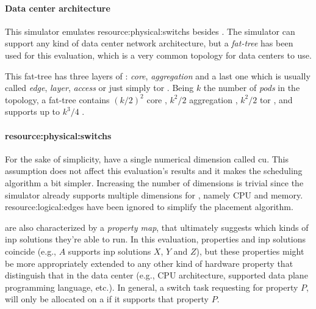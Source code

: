 \paragraph{Data center architecture}
This simulator emulates \glspl{resource:physical:switch} besides .
The simulator can support any kind of data center network architecture, but a \textit{fat-tree} has been used for this evaluation, which is a very common topology for data centers to use.

This fat-tree has three layers of : \textit{core}, \textit{aggregation} and a last one which is usually called \textit{edge}, \textit{layer}, \textit{access} or just simply \gls{tor} .
Being $k$ the number of \textit{pods} in the topology, a fat-tree contains $(k/2)^2$ core , $k^2/2$ aggregation , $k^2/2$ \gls{tor} , and supports up to $k^3/4$ .

\paragraph{\Glspl{resource:physical:switch}} \label{simulator_switch_resources}
For the sake of simplicity,  have a single numerical dimension called \gls{cu}.
This assumption does not affect this evaluation's results and it makes the scheduling algorithm a bit simpler.
Increasing the number of  dimensions is trivial since the simulator already supports multiple dimensions for , namely CPU and memory.
\Glspl{resource:logical:edge} have been ignored to simplify the placement algorithm.

 are also characterized by a \textit{property map}, that ultimately suggests which kinds of \gls{inp} solutions they're able to run.
In this evaluation, properties and \gls{inp} solutions coincide (e.g.,  $A$ supports \gls{inp} solutions $X$, $Y$ and $Z$), but these properties might be more appropriately extended to any other kind of hardware property that distinguish that  in the data center (e.g., CPU architecture, supported data plane programming language, etc.).
In general, a switch task requesting for property $P$, will only be allocated on a  if it supports that property $P$.
